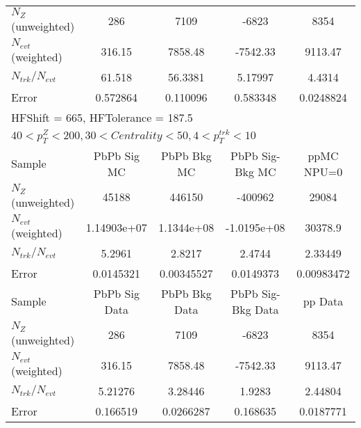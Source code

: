 \begin{table}[h!]
\begin{tabular}{|l|c|c|c|c|}
$N_Z$ (unweighted)& 286            & 7109           & -6823          & 8354           \\
$N_{evt}$ (weighted)& 316.15         & 7858.48        & -7542.33       & 9113.47        \\
$N_{trk}/N_{evt}$& 61.518         & 56.3381        & 5.17997        & 4.4314         \\
Error          & 0.572864       & 0.110096       & 0.583348       & 0.0248824      \\
\hline\hline
\multicolumn{5}{l}{ HFShift = 665, HFTolerance = 187.5}\\
\multicolumn{5}{l}{ $40 < p_{T}^{Z} < 200, 30 < Centrality < 50, 4 < p_{T}^{trk} < 10$}\\
\hline\hline
Sample         & PbPb Sig MC    & PbPb Bkg MC    & PbPb Sig-Bkg MC& ppMC NPU=0     \\
$N_Z$ (unweighted)& 45188          & 446150         & -400962        & 29084          \\
$N_{evt}$ (weighted)& 1.14903e+07    & 1.1344e+08     & -1.0195e+08    & 30378.9        \\
$N_{trk}/N_{evt}$& 5.2961         & 2.8217         & 2.4744         & 2.33449        \\
Error          & 0.0145321      & 0.00345527     & 0.0149373      & 0.00983472     \\
\hline
Sample         & PbPb Sig Data  & PbPb Bkg Data  & PbPb Sig-Bkg Data& pp Data  \\
$N_Z$ (unweighted)& 286            & 7109           & -6823          & 8354           \\
$N_{evt}$ (weighted)& 316.15         & 7858.48        & -7542.33       & 9113.47        \\
$N_{trk}/N_{evt}$& 5.21276        & 3.28446        & 1.9283         & 2.44804        \\
Error          & 0.166519       & 0.0266287      & 0.168635       & 0.0187771      \\
\hline\hline
\end{tabular}
\end{table}
\clearpage
